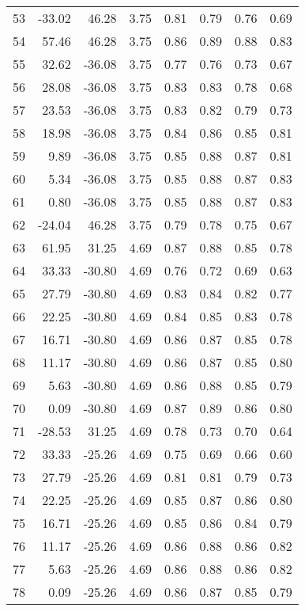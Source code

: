 \begin{center}
\begin{longtable}{crrccccc}
53 & -33.02 & 46.28 &  3.75 &  0.81 &  0.79 &  0.76 &  0.69\\
54 & 57.46 & 46.28 &  3.75 &  0.86 &  0.89 &  0.88 &  0.83\\
55 & 32.62 & -36.08 &  3.75 &  0.77 &  0.76 &  0.73 &  0.67\\
56 & 28.08 & -36.08 &  3.75 &  0.83 &  0.83 &  0.78 &  0.68\\
57 & 23.53 & -36.08 &  3.75 &  0.83 &  0.82 &  0.79 &  0.73\\
58 & 18.98 & -36.08 &  3.75 &  0.84 &  0.86 &  0.85 &  0.81\\
59 &  9.89 & -36.08 &  3.75 &  0.85 &  0.88 &  0.87 &  0.81\\
60 &  5.34 & -36.08 &  3.75 &  0.85 &  0.88 &  0.87 &  0.83\\
61 &  0.80 & -36.08 &  3.75 &  0.85 &  0.88 &  0.87 &  0.83\\
62 & -24.04 & 46.28 &  3.75 &  0.79 &  0.78 &  0.75 &  0.67\\
63 & 61.95 & 31.25 &  4.69 &  0.87 &  0.88 &  0.85 &  0.78\\
64 & 33.33 & -30.80 &  4.69 &  0.76 &  0.72 &  0.69 &  0.63\\
65 & 27.79 & -30.80 &  4.69 &  0.83 &  0.84 &  0.82 &  0.77\\
66 & 22.25 & -30.80 &  4.69 &  0.84 &  0.85 &  0.83 &  0.78\\
67 & 16.71 & -30.80 &  4.69 &  0.86 &  0.87 &  0.85 &  0.78\\
68 & 11.17 & -30.80 &  4.69 &  0.86 &  0.87 &  0.85 &  0.80\\
69 &  5.63 & -30.80 &  4.69 &  0.86 &  0.88 &  0.85 &  0.79\\
70 &  0.09 & -30.80 &  4.69 &  0.87 &  0.89 &  0.86 &  0.80\\
71 & -28.53 & 31.25 &  4.69 &  0.78 &  0.73 &  0.70 &  0.64\\
72 & 33.33 & -25.26 &  4.69 &  0.75 &  0.69 &  0.66 &  0.60\\
73 & 27.79 & -25.26 &  4.69 &  0.81 &  0.81 &  0.79 &  0.73\\
74 & 22.25 & -25.26 &  4.69 &  0.85 &  0.87 &  0.86 &  0.80\\
75 & 16.71 & -25.26 &  4.69 &  0.85 &  0.86 &  0.84 &  0.79\\
76 & 11.17 & -25.26 &  4.69 &  0.86 &  0.88 &  0.86 &  0.82\\
77 &  5.63 & -25.26 &  4.69 &  0.86 &  0.88 &  0.86 &  0.82\\
78 &  0.09 & -25.26 &  4.69 &  0.86 &  0.87 &  0.85 &  0.79\\

\end{longtable}
\end{center}
